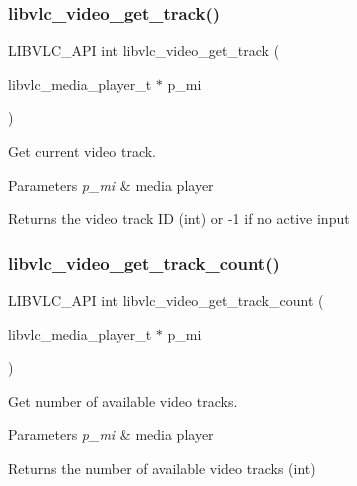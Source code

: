 \subsubsection{\texorpdfstring{libvlc\+\_\+video\+\_\+get\+\_\+track()}{libvlc\_video\_get\_track()}}
{\footnotesize\ttfamily L\+I\+B\+V\+L\+C\+\_\+\+A\+PI int libvlc\+\_\+video\+\_\+get\+\_\+track (\begin{DoxyParamCaption}\item[{libvlc\+\_\+media\+\_\+player\+\_\+t $\ast$}]{p\+\_\+mi }\end{DoxyParamCaption})}

Get current video track.


\begin{DoxyParams}{Parameters}
{\em p\+\_\+mi} & media player \\
\hline
\end{DoxyParams}
\begin{DoxyReturn}{Returns}
the video track ID (int) or -\/1 if no active input 
\end{DoxyReturn}
\mbox{\label{group__libvlc__video_ga07728229ba21bd8247fc191a59e6fc8c}} 
\subsubsection{\texorpdfstring{libvlc\+\_\+video\+\_\+get\+\_\+track\+\_\+count()}{libvlc\_video\_get\_track\_count()}}
{\footnotesize\ttfamily L\+I\+B\+V\+L\+C\+\_\+\+A\+PI int libvlc\+\_\+video\+\_\+get\+\_\+track\+\_\+count (\begin{DoxyParamCaption}\item[{libvlc\+\_\+media\+\_\+player\+\_\+t $\ast$}]{p\+\_\+mi }\end{DoxyParamCaption})}

Get number of available video tracks.


\begin{DoxyParams}{Parameters}
{\em p\+\_\+mi} & media player \\
\hline
\end{DoxyParams}
\begin{DoxyReturn}{Returns}
the number of available video tracks (int) 
\end{DoxyReturn}
\mbox{\label{group__libvlc__video_ga7de5a1b8656341dc9d60fb62c62f802e}} 
